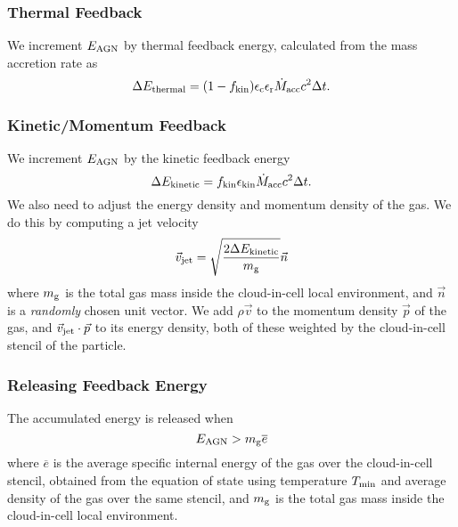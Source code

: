 \subsubsection{Thermal Feedback}

We increment $E_{\rm AGN}$ by
thermal feedback energy, calculated from the
mass accretion rate as 
\begin{equation} %
\Delta E_{\rm thermal} = (1 - f_{\rm kin})
\epsilon_{\rm c} \epsilon_{\rm r} \dot{M}_{\rm acc} c^2 \Delta t .
\end{equation}

\subsubsection{Kinetic/Momentum Feedback}

We increment $E_{\rm AGN}$ by the kinetic feedback energy
\begin{equation} %
\Delta E_{\rm kinetic} =
f_{\rm kin} \epsilon_{\rm kin} \dot{M}_{\rm acc} c^2 \Delta t .
\end{equation}
We also need to adjust the energy density
and momentum density of the gas.
We do this by computing a jet velocity
\begin{equation}
\vec{v}_{\rm jet} = \sqrt{\frac{2 \Delta E_{\rm kinetic}}{m_{\rm g}}} \vec{n}
\end{equation}
where $m_{\rm g}$ is the total gas mass inside the cloud-in-cell local
environment, and $\vec{n}$ is a {\em randomly} chosen unit vector.
We add
$\rho \vec{v}$ to the momentum density $\vec{p}$ of the gas,
and
$\vec{v}_{\rm jet} \cdot \vec{p}$ to its energy density,
both of these weighted by
the cloud-in-cell stencil of the particle.

\subsubsection{Releasing Feedback Energy}

The accumulated energy is released when
\begin{equation}
E_{\rm AGN} > m_{\rm g} \overline{e}
\label{eq:E_agn}
\end{equation}
where $\overline{e}$ is the average specific internal energy of the
gas over the cloud-in-cell stencil, obtained from the equation of
state using temperature $T_{\rm min}$ and
average density of the gas over the same stencil,
and $m_{\rm g}$ is the total gas mass inside the cloud-in-cell local environment.


